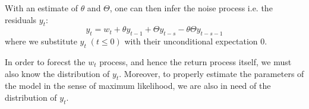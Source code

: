 With an estimate of $\theta$ and $\Theta$, one can then infer the
noise process i.e. the residuals $y_t$:
\begin{equation}
  \label{eq:infer_y}
  y_t = w_t + \theta y_{t-1} + \Theta y_{t-s} - \theta \Theta y_{t-s-1}
\end{equation}
where we substitute $y_t\;(t \leq 0)$ with their unconditional
expectation 0.

In order to forecst the $w_t$ process, and hence the return process
itself, we must also know the distribution of $y_t$. Moreover, to
properly estimate the parameters of the model in the sense of maximum
likelihood, we are also in need of the distribution of $y_t$.

